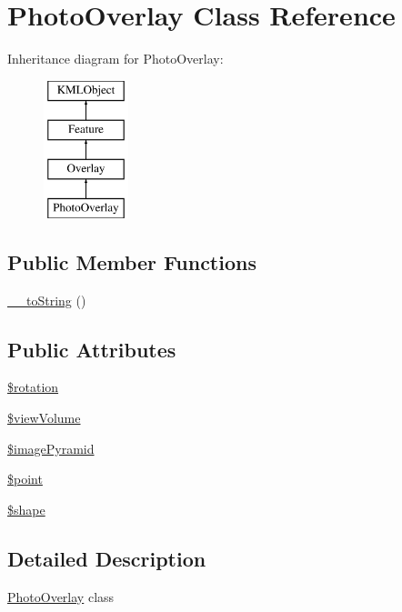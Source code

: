 \hypertarget{classPhotoOverlay}{
\section{PhotoOverlay Class Reference}
\label{df/d99/classPhotoOverlay}
}
Inheritance diagram for PhotoOverlay:\begin{figure}[H]
\begin{center}
\leavevmode
\includegraphics[height=4.000000cm]{df/d99/classPhotoOverlay}
\end{center}
\end{figure}
\subsection*{Public Member Functions}
\begin{DoxyCompactItemize}
\item 
\hyperlink{classPhotoOverlay_a39a681af8ee33d34bacf9da826456564}{\_\-\_\-toString} ()
\end{DoxyCompactItemize}
\subsection*{Public Attributes}
\begin{DoxyCompactItemize}
\item 
\hyperlink{classPhotoOverlay_a2aad7589f2efda0a97b373bbcbeeb3d3}{\$rotation}
\item 
\hyperlink{classPhotoOverlay_af346c3cea435bb99ee00ac5d705e11d8}{\$viewVolume}
\item 
\hyperlink{classPhotoOverlay_ab5d5dc3442461c396ce3debbab8ba150}{\$imagePyramid}
\item 
\hyperlink{classPhotoOverlay_a8f0af1bc117dfd170a416c72c992c0f0}{\$point}
\item 
\hyperlink{classPhotoOverlay_a9066898d4c26ba8b18bc863e39553879}{\$shape}
\end{DoxyCompactItemize}


\subsection{Detailed Description}
\hyperlink{classPhotoOverlay}{PhotoOverlay} class 

